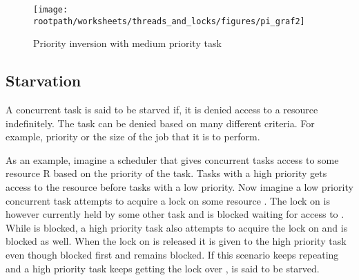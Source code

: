 \begin{figure}[htbp]
\centering
 \texttt{[image: \\rootpath/worksheets/threads\_and\_locks/figures/pi\_graf2]} 
 \caption{Priority inversion with medium priority task}
\label{fig:priority_inversion_m}
\end{figure}

\subsection{Starvation}
A concurrent task is said to be starved if, it is denied access to a resource indefinitely\cite[p. 459]{tanenbaum2008modern}. The task can be denied based on many different criteria. For example, priority or the size of the job that it is to perform.

As an example, imagine a scheduler that gives concurrent tasks access to some resource R based on the priority of the task. Tasks with a high priority gets access to the resource before tasks with a low priority. Now imagine a low priority concurrent task  attempts to acquire a lock on some resource . The lock on  is however currently held by some other task and  is blocked waiting for access to . While  is blocked, a high priority task  also attempts to acquire the lock on  and is blocked as well. When the lock on  is released it is given to the high priority task  even though  blocked first and  remains blocked. If this scenario keeps repeating and a high priority task keeps getting the lock over ,  is said to be starved.


